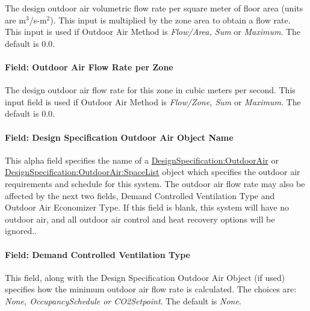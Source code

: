 The design outdoor air volumetric flow rate per square meter of floor area (units are m\(^{3}\)/s-m\(^{2}\)). This input is multiplied by the zone area to obtain a flow rate. This input is used if Outdoor Air Method is \emph{Flow/Area, Sum} or \emph{Maximum}. The default is 0.0.

\paragraph{Field: Outdoor Air Flow Rate per Zone}\label{field-outdoor-air-flow-rate-per-zone}

The design outdoor air flow rate for this zone in cubic meters per second. This input field is used if Outdoor Air Method is \emph{Flow/Zone, Sum} or \emph{Maximum}. The default is 0.0.

\paragraph{Field: Design Specification Outdoor Air Object Name}\label{field-design-specification-outdoor-air-object-name-001}

This alpha field specifies the name of a \hyperref[designspecificationoutdoorair]{DesignSpecification:OutdoorAir} or \hyperref[designspecificationoutdoorairspacelist]{DesignSpecification:OutdoorAir:SpaceList} object which specifies the outdoor air requirements and schedule for this system. The outdoor air flow rate may also be affected by the next two fields, Demand Controlled Ventilation Type and Outdoor Air Economizer Type. If this field is blank, this system will have no outdoor air, and all outdoor air control and heat recovery options will be ignored..

\paragraph{Field: Demand Controlled Ventilation Type}\label{field-demand-controlled-ventilation-type}

This field, along with the Design Specification Outdoor Air Object (if used) specifies how the minimum outdoor air flow rate is calculated. The choices are: \emph{None, OccupancySchedule or CO2Setpoint}. The default is \emph{None}.

